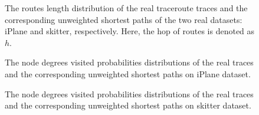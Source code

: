 \documentclass[a4paper]{llncs}
\begin{document}
\begin{figure}[!t]
\centering
{}
\hspace{2em}
\vspace{-1.7em}
\caption{The routes length distribution of the real traceroute traces and the corresponding unweighted shortest paths of the two real datasets: iPlane and skitter, respectively. Here, the hop of routes is denoted as $h$.}
\label{figure2}
\vspace{-0.8em}
\end{figure}


\begin{figure}[!t]
\centering
{}
\hspace{2em}
\vspace{-1.7em}
\caption{The node degrees visited probabilities distributions of the real traces and the corresponding unweighted shortest paths on iPlane dataset.}
\label{figure3}
\vspace{-0.8em}
\end{figure}

\begin{figure}[!t]
\centering
{}
\hspace{2em}
\vspace{-1.7em}
\caption{The node degrees visited probabilities distributions of the real traces and the corresponding unweighted shortest paths on skitter dataset.}
\label{figure4}
\vspace{-0.5em}
\end{figure}
\end{document}
